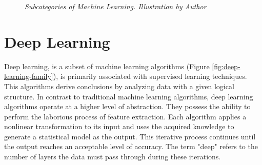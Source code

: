 \newpage

\begin{figure}[H]
  \centering
    \caption[Subcategories of Machine Learning.]{\textit{Subcategories of Machine Learning. Illustration by Author}}
    {\label{fig:ml_branches}}
\end{figure}


\section{Deep Learning}

Deep learning, is a subset of machine learning algorithms (Figure
\ref{fig:deep-learning-family}), is primarily associated with supervised
learning techniques. This algorithms derive conclusions by analyzing data with
a given logical structure. In contrast to traditional machine learning
algorithms, deep learning algorithms operate at a higher level of abstraction.
They possess the ability to perform the laborious process of feature
extraction. Each algorithm applies a nonlinear transformation to its input and
uses the acquired knowledge to generate a statistical model as the output. This
iterative process continues until the output reaches an acceptable level of
accuracy. The term "deep" refers to the number of layers the data must pass
through during these iterations. \\



